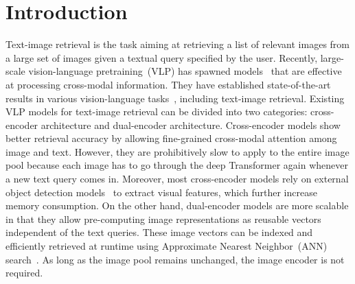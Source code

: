 \section{Introduction}
Text-image retrieval is the task aiming at retrieving a list of relevant images from 
a large set of images given a textual query specified by the user. 
Recently, large-scale vision-language pretraining~(VLP) has spawned models~\cite{tan-bansal-2019-lxmert,oscar,clip} that are effective at processing cross-modal information. They have established state-of-the-art results in various vision-language tasks~\cite{vqa,nlvr}, including text-image retrieval. Existing VLP models for text-image retrieval can be divided into two categories: cross-encoder architecture and dual-encoder architecture. Cross-encoder models show better retrieval accuracy by allowing fine-grained cross-modal attention among image and text. However, they are prohibitively slow to apply to the entire image pool because each image has to go through the deep Transformer again whenever a new text query comes in. Moreover, most cross-encoder models rely on external object detection models~\cite{fasterrcnn} to extract visual features, which further increase memory consumption. On the other hand, dual-encoder models are more scalable in that they allow pre-computing image representations as 
reusable vectors independent of the text queries. These image vectors can be
indexed and efficiently retrieved at runtime using Approximate Nearest Neighbor~(ANN) 
search~\cite{faiss}. As long as the image pool remains unchanged, 
the image encoder is not required. 

